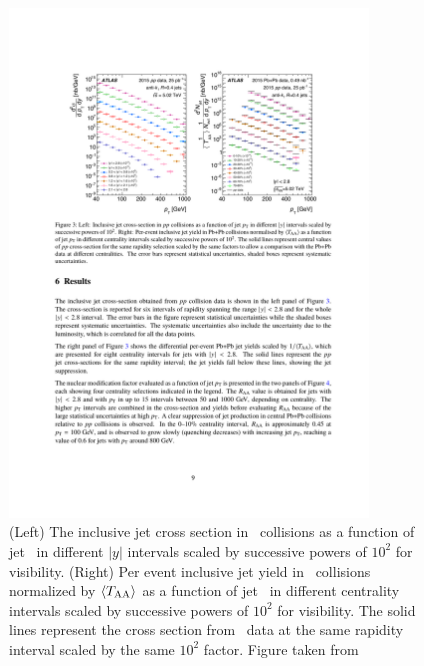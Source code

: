 \begin{figure}[htbp]
\begin{center}
\includegraphics[width=0.85\textwidth]{figures/jetMeasurements/jetYields}
\caption{(Left) The inclusive jet cross section in \pp\ collisions as a function of jet \pt\ in different $|y|$ intervals scaled by successive powers of $10^2$ for visibility. (Right) Per event inclusive jet yield in \pbpb\ collisions normalized by $\langle \mbox{$T_{\mathrm{AA}}$} \rangle$ as a function of jet \pt\ in different centrality intervals scaled by successive powers of $10^2$ for visibility. The solid lines represent the cross section from \pp\ data at the same rapidity interval scaled by the same $10^2$ factor.  Figure taken from \cite{2019108}}
\label{fig:jet_yields}
\end{center}
\end{figure}


